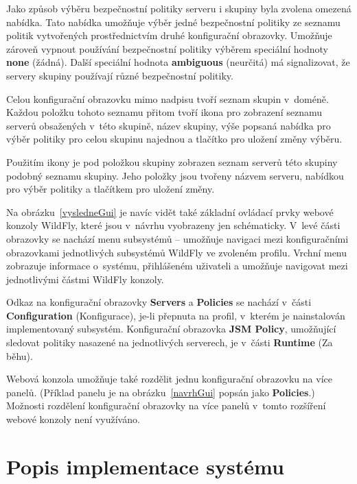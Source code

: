 Jako způsob výběru bezpečnostní politiky serveru i skupiny byla zvolena omezená nabídka. Tato nabídka umožňuje výběr jedné bezpečnostní politiky ze seznamu politik vytvořených prostřednictvím druhé konfigurační obrazovky. Umožňuje zároveň vypnout používání bezpečnostní politiky výběrem speciální hodnoty {\bf none} (žádná). Další speciální hodnota {\bf ambiguous} (neurčitá) má signalizovat, že servery skupiny používají různé bezpečnostní politiky.

Celou konfigurační obrazovku mimo nadpisu tvoří seznam skupin v~doméně. Každou položku tohoto seznamu přitom tvoří ikona pro zobrazení seznamu serverů obsažených v~této skupině, název skupiny, výše popsaná nabídka pro výběr politiky pro celou skupinu najednou a tlačítko pro uložení změny výběru.

Použitím ikony je pod položkou skupiny zobrazen seznam serverů této skupiny podobný seznamu skupiny. Jeho položky jsou tvořeny názvem serveru, nabídkou pro výběr politiky a tlačítkem pro uložení změny.

Na obrázku~\ref{vysledneGui} je navíc vidět také základní ovládací prvky webové konzoly WildFly, které jsou v~návrhu vyobrazeny jen schématicky.
V~levé části obrazovky se nachází menu subsystémů -- umožňuje navigaci mezi konfiguračními obrazovkami jednotlivých subsystémů WildFly ve zvoleném profilu.
Vrchní menu zobrazuje informace o~systému, přihlášeném uživateli a umožňuje navigovat mezi jednotlivými částmi WildFly konzoly.

Odkaz na konfigurační obrazovky {\bf Servers} a {\bf Policies} se nachází v~části {\bf Configuration} (Konfigurace), je-li přepnuta na profil, v~kterém je nainstalován implementovaný subsystém. Konfigurační obrazovka {\bf JSM Policy}, umožňující sledovat politiky nasazené na jednotlivých serverech, je v~části {\bf Runtime} (Za běhu).

Webová konzola umožňuje také rozdělit jednu konfigurační obrazovku na více panelů. (Příklad panelu je na obrázku~\ref{navrhGui} popsán jako {\bf Policies}.)
Možnosti rozdělení konfigurační obrazovky na více panelů v~tomto rozšíření webové konzoly není využíváno.

\chapter{Popis implementace systému} \label{implementace}


